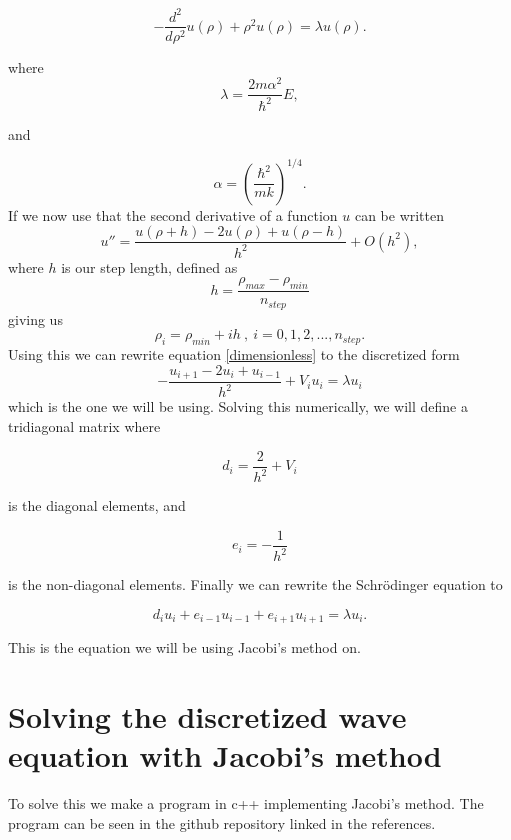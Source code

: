 \documentclass{aa}   %
\begin{document}
\begin{equation}\label{dimensionless}
  -\frac{d^2}{d\rho^2} u(\rho) + \rho^2u(\rho)  = \lambda u(\rho). 
\end{equation}

where 
\begin{equation}
\lambda = \frac{2m\alpha^2}{\hbar^2}E,
\end{equation}

and 

\begin{equation}
\alpha = \left(\frac{\hbar^2}{mk}\right)^{1/4}.
\end{equation}
If we now use that the second derivative of a function $u$ can be written
\begin{equation}
    u''=\frac{u(\rho+h) -2u(\rho) +u(\rho-h)}{h^2} +O(h^2),
\end{equation}
where $h$ is our step length, defined as 
\begin{equation}
 h = \frac{\rho_{max}-\rho_{min}}{n_{step}}
\end{equation}
giving us 
\begin{equation}
 \rho_i = \rho_{min} +ih~,~i=0,1,2,...,n_{step}.
\end{equation}
Using this we can rewrite equation \ref{dimensionless} to the discretized form
\begin{equation}
 -\frac{u_{i+1} -2u_i +u_{i-1} }{h^2}+V_iu_i  = \lambda u_i
\end{equation}
which is the one we will be using. Solving this numerically, we will define a tridiagonal matrix where 

\begin{equation}
 d_i=\frac{2}{h^2}+V_i
\end{equation}

is the diagonal elements, and

\begin{equation}
 e_i=-\frac{1}{h^2}
\end{equation}

is the non-diagonal elements. Finally we can rewrite the Schrödinger equation to

\begin{equation}
 d_iu_i+e_{i-1}u_{i-1}+e_{i+1}u_{i+1}  = \lambda u_i.
\end{equation}

This is the equation we will be using Jacobi's method on.
\section{Solving the discretized wave equation with Jacobi's method}   \label{sec:Saha}
To solve this we make a program in c++ implementing Jacobi's method.
The program can be seen in the github repository linked in the references.
\end{document}
